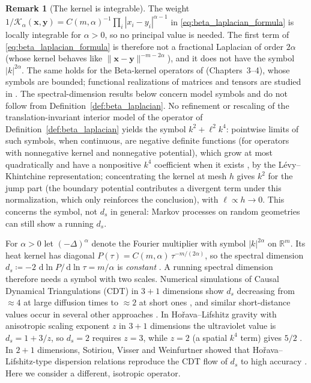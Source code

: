 \documentclass[11pt,a4paper,reqno]{amsart}
\theoremstyle{definition}
\newtheorem{remark}[theorem]{Remark}
\numberwithin{equation}{section}
\newcommand{\R}{\mathbb{R}}
\newcommand{\dif}{\,\mathrm{d}}
\begin{document}
\begin{remark}[The kernel is integrable]
\label{rem:kernel_integrable}
The weight $1/\mathcal{K}_\alpha(\mathbf{x}, \mathbf{y}) = C(m,\alpha)^{-1} \prod_i |x_i - y_i|^{\alpha - 1}$ in \eqref{eq:beta_laplacian_formula} is locally integrable for $\alpha > 0$, so no principal value is needed. The first term of \eqref{eq:beta_laplacian_formula} is therefore not a fractional Laplacian of order $2\alpha$ (whose kernel behaves like $\|\mathbf{x} - \mathbf{y}\|^{-m - 2\alpha}$), and it does not have the symbol $|k|^{2\alpha}$. The same holds for the Beta-kernel operators of \cite{silvafilho2026treatise} (Chapters~3--4), whose symbols are bounded; functional realizations of matrices and tensors are studied in \cite{silvafilho2026trilogy}. The spectral-dimension results below concern model symbols and do not follow from Definition~\ref{def:beta_laplacian}. No refinement or rescaling of the translation-invariant interior model of the operator of Definition~\ref{def:beta_laplacian} yields the symbol $k^2 + \ell^2 k^4$: pointwise limits of such symbols, when continuous, are negative definite functions (for operators with nonnegative kernel and nonnegative potential), which grow at most quadratically and have a nonpositive $k^4$ coefficient when it exists \cite{berg1975potential}, by the L\'evy--Khintchine representation; concentrating the kernel at mesh $h$ gives $k^2$ for the jump part (the boundary potential contributes a divergent term under this normalization, which only reinforces the conclusion), with $\ell \propto h \to 0$. This concerns the symbol, not $d_s$ in general: Markov processes on random geometries can still show a running $d_s$.
\end{remark}

For $\alpha > 0$ let $(-\Delta)^\alpha$ denote the Fourier multiplier with symbol $|k|^{2\alpha}$ on $\R^m$. Its heat kernel has diagonal $P(\tau) = C(m,\alpha)\,\tau^{-m/(2\alpha)}$, so the spectral dimension $d_s \coloneqq -2\, \dif \ln P / \dif \ln \tau = m/\alpha$ is \emph{constant} \cite{silvafilho2026treatise}. A running spectral dimension therefore needs a symbol with two scales. Numerical simulations of Causal Dynamical Triangulations (CDT) in $3+1$ dimensions show $d_s$ decreasing from $\approx 4$ at large diffusion times to $\approx 2$ at short ones \cite{ambjorn2005spectral}, and similar short-distance values occur in several other approaches \cite{carlip2017dimension}. In Ho\v{r}ava--Lifshitz gravity with anisotropic scaling exponent $z$ in $3+1$ dimensions the ultraviolet value is $d_s = 1 + 3/z$, so $d_s = 2$ requires $z = 3$, while $z = 2$ (a spatial $k^4$ term) gives $5/2$ \cite{horava2009spectral}. In $2+1$ dimensions, Sotiriou, Visser and Weinfurtner showed that Ho\v{r}ava--Lifshitz-type dispersion relations reproduce the CDT flow of $d_s$ to high accuracy \cite{sotiriou2011spectral}. Here we consider a different, isotropic operator.
\end{document}
